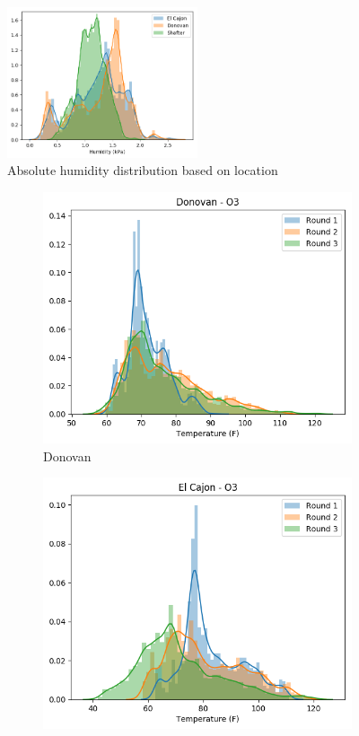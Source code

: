 \documentclass[journal abbreviation, manuscript]{copernicus}
\begin{document}
\begin{figure}[H]
\centering
\includegraphics[width=0.5\textwidth]{results/distributions/humidity.png}
\caption{Absolute humidity distribution based on
location}
\label{fig:humidity}
\end{figure}

\begin{figure}[H]
\centering
\begin{subfigure}{0.32\textwidth}
\includegraphics[width=\textwidth]{results/distributions/location_donovan_temperature.png}
\caption{Donovan}
\end{subfigure}
\begin{subfigure}{0.32\textwidth}
\includegraphics[width=\textwidth]{results/distributions/location_elcajon_temperature.png}

\end{subfigure}
\end{figure}
\end{document}
